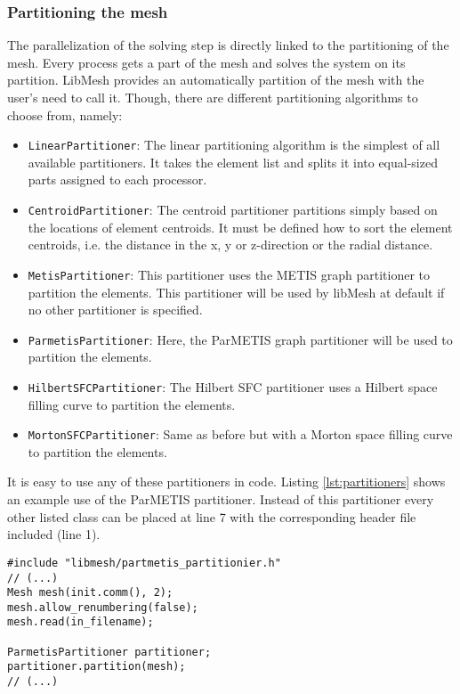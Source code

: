   \subsubsection{Partitioning the mesh}\label{sec:Impl-Parallel-Partitioning}
   The parallelization of the solving step is directly linked to the partitioning of the mesh. Every process gets a part of the mesh and solves the system on its partition. LibMesh provides an automatically partition of the mesh with the user's need to call it. Though, there are different partitioning algorithms to choose from, namely:
   \begin{itemize}
   	\item \texttt{LinearPartitioner}: The linear partitioning algorithm is the simplest of all available partitioners. It takes the element list and splits it into equal-sized parts assigned to each processor.
   	\item \texttt{CentroidPartitioner}: The centroid partitioner partitions simply based on the locations of element centroids. It must be defined how to sort the element centroids, i.e. the distance in the x, y or z-direction or the radial distance.
   	\item \texttt{MetisPartitioner}: This partitioner uses the METIS graph partitioner to partition the elements. This partitioner will be used by libMesh at default if no other partitioner is specified.
   	\item \texttt{ParmetisPartitioner}: Here, the ParMETIS graph partitioner will be used to partition the elements.
   	\item \texttt{HilbertSFCPartitioner}: The Hilbert SFC partitioner uses a Hilbert space filling curve to partition the elements.
   	\item \texttt{MortonSFCPartitioner}: Same as before but with a Morton space filling curve to partition the elements.
   \end{itemize}
   It is easy to use any of these partitioners in code. Listing \ref{lst:partitioners} shows an example use of the ParMETIS partitioner. Instead of this partitioner every other listed class can be placed at line 7 with the corresponding header file included (line 1).
\begin{lstlisting}[caption=Mesh partitioning example,label=lst:partitioners,keepspaces=true]
#include "libmesh/partmetis_partitionier.h"
// (...)
Mesh mesh(init.comm(), 2);
mesh.allow_renumbering(false);
mesh.read(in_filename);	

ParmetisPartitioner partitioner;
partitioner.partition(mesh);
// (...)
\end{lstlisting}
  
